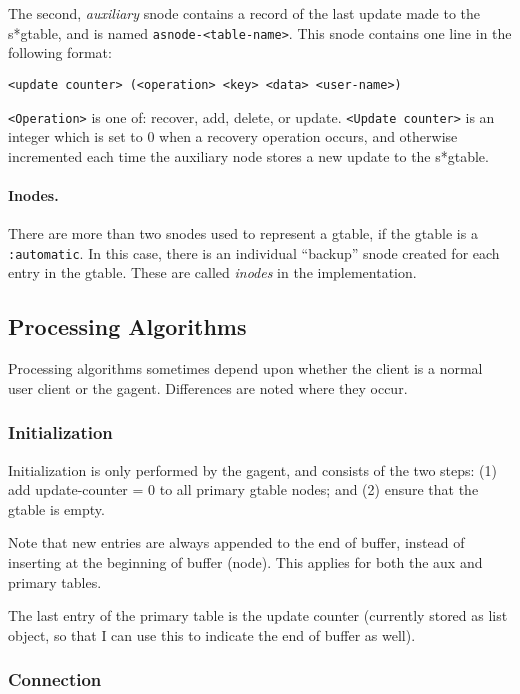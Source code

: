 The second, {\em auxiliary} snode contains a record of the last update made
to the s*gtable, and is named {\tt asnode-<table-name>}.  This snode
contains one line in the following format:

\small\begin{verbatim}
<update counter> (<operation> <key> <data> <user-name>)
\end{verbatim} \normalsize

{\tt <Operation>} is one of: recover, add, delete, or update.  {\tt <Update
counter>} is an integer which is set to 0 when a recovery operation occurs,
and otherwise incremented each time the auxiliary node stores a new update
to the s*gtable.

\paragraph{Inodes.}

There are more than two snodes used to represent a gtable, if the gtable is
a {\tt :automatic}.  In this case, there is an individual ``backup'' snode
created for each entry in the gtable.  These are called {\em inodes} in the
implementation.

\subsection {Processing Algorithms}

Processing algorithms sometimes depend upon whether
the client is a normal user client or the gagent.  Differences are noted
where they occur.

\subsubsection{Initialization}

Initialization is only performed by the gagent, and consists of the two
steps: (1) add update-counter = 0 to all primary gtable nodes; and (2)
ensure that the gtable is empty.

Note that new entries are always appended to the end of buffer, instead of
inserting at the beginning of buffer (node).  This applies for both the aux
and primary tables.

The last entry of the primary table is the update counter (currently stored
as list object, so that I can use this to indicate the end of buffer as
well).

\subsubsection{Connection}

